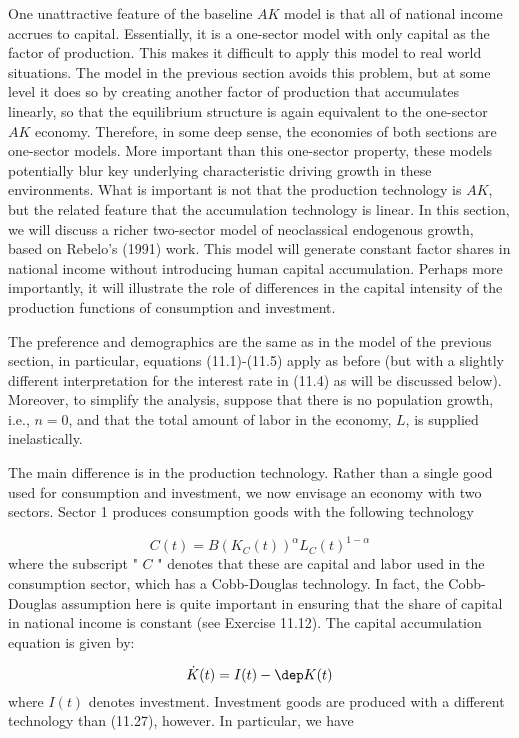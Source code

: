 \documentclass[\topdir/lecture\_notes.tex]{subfiles}
\begin{document}
One unattractive feature of the baseline $AK$ model is that all of national income accrues to capital. Essentially, it is a one-sector model with only capital as the factor of production. This makes it difficult to apply this model to real world situations. The model in the previous section avoids this problem, but at some level it does so by creating another factor of production that accumulates linearly, so that the equilibrium structure is again equivalent to the one-sector $AK$ economy. Therefore, in some deep sense, the economies of both sections are one-sector models. More important than this one-sector property, these models potentially blur key underlying characteristic driving growth in these environments. What is important is not that the production technology is $AK$, but the related feature that the accumulation technology is linear. In this section, we will discuss a richer two-sector model of neoclassical endogenous growth, based on Rebelo's (1991) work. This model will generate constant factor shares in national income without introducing human capital accumulation. Perhaps more importantly, it will illustrate the role of differences in the capital intensity of the production functions of consumption and investment.

The preference and demographics are the same as in the model of the previous section, in particular, equations (11.1)-(11.5) apply as before (but with a slightly different interpretation for the interest rate in (11.4) as will be discussed below). Moreover, to simplify the analysis, suppose that there is no population growth, i.e., $n=0$, and that the total amount of labor in the economy, $L$, is supplied inelastically.

The main difference is in the production technology. Rather than a single good used for consumption and investment, we now envisage an economy with two sectors. Sector 1 produces consumption goods with the following technology

\[
C(t)=B\left(K_{C}(t)\right)^{\alpha} L_{C}(t)^{1-\alpha}
\]
 where the subscript " $C$ " denotes that these are capital and labor used in the consumption sector, which has a Cobb-Douglas technology. In fact, the Cobb-Douglas assumption here is quite important in ensuring that the share of capital in national income is constant (see Exercise 11.12). The capital accumulation equation is given by:

\[
\dot{K}(t)=I(t)-\dep K(t)
\]
 where $I(t)$ denotes investment. Investment goods are produced with a different technology than (11.27), however. In particular, we have
\end{document}
